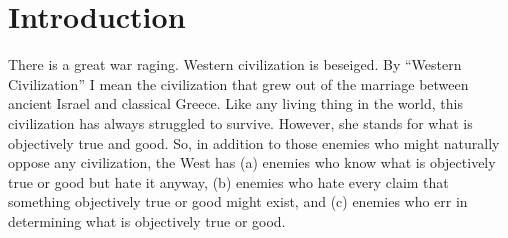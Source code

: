 \documentclass[twocolumn]{article}
\begin{document}
\thispagestyle{fancy}

\section{Introduction}

There is a great war raging.  Western civilization is beseiged.  By ``Western
Civilization'' I mean the civilization that grew out of the marriage between
ancient Israel and classical Greece.  Like any living thing in the world, this
civilization has always struggled to survive.  However, she stands for what is
objectively true and good.  So, in addition to those enemies who might
naturally oppose any civilization, the West has (a) enemies who know what is
objectively true or good but hate it anyway, (b) enemies who hate every claim
that something objectively true or good might exist, and (c) enemies who err in
determining what is objectively true or good.
\end{document}
